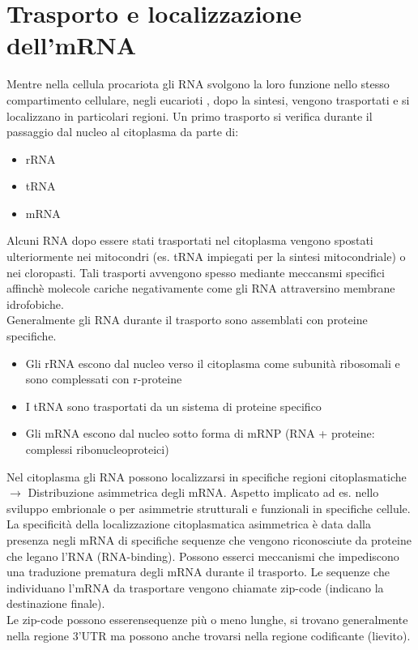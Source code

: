 \documentclass{article}
\begin{document}
\section{Trasporto e localizzazione dell'mRNA}
Mentre nella cellula procariota gli RNA svolgono la loro funzione nello stesso compartimento cellulare,
negli eucarioti , dopo la sintesi, vengono trasportati e si localizzano in particolari regioni.
Un primo trasporto si verifica durante il passaggio dal nucleo al citoplasma da parte di:
\begin{itemize}
    \item rRNA
    \item tRNA
    \item mRNA
\end{itemize}
Alcuni RNA dopo essere stati trasportati nel citoplasma vengono spostati ulteriormente nei mitocondri (es. tRNA impiegati per la
sintesi mitocondriale) o nei cloropasti. Tali trasporti avvengono spesso mediante meccansmi specifici affinchè molecole cariche negativamente come gli RNA attraversino membrane idrofobiche.\\
Generalmente gli RNA durante il trasporto sono assemblati con proteine specifiche. 
\begin{itemize}
    \item Gli rRNA escono dal nucleo verso il citoplasma come subunità ribosomali e sono complessati con r-proteine
    \item I tRNA sono trasportati da un sistema di proteine specifico
    \item Gli mRNA escono dal nucleo sotto forma di mRNP (RNA + proteine: complessi ribonucleoproteici)
\end{itemize}
Nel citoplasma gli RNA possono localizzarsi in specifiche regioni citoplasmatiche $\rightarrow$ Distribuzione asimmetrica degli mRNA. Aspetto implicato ad es. nello sviluppo embrionale o per asimmetrie
strutturali e funzionali in specifiche cellule.
La specificità della localizzazione citoplasmatica asimmetrica è data dalla
presenza negli mRNA di specifiche sequenze che vengono riconosciute da
proteine che legano l'RNA (RNA-binding).
Possono esserci meccanismi che impediscono una traduzione prematura degli mRNA durante il trasporto. Le sequenze che individuano l'mRNA da trasportare vengono chiamate zip-code (indicano la destinazione finale).\\
Le zip-code possono esserensequenze più o meno lunghe, si trovano generalmente
nella regione 3'UTR ma possono anche trovarsi nella regione codificante (lievito).
\end{document}
